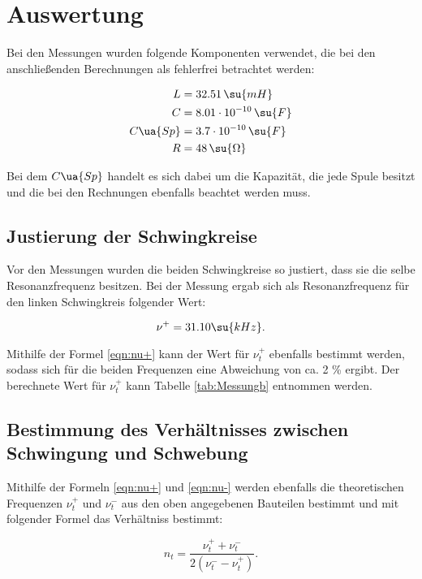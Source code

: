 \section{Auswertung}

Bei den Messungen wurden folgende Komponenten verwendet, die bei den anschließenden
Berechnungen als fehlerfrei betrachtet werden:

\begin{align}
  L        &= 32.51              \, \su{mH}       \\
  C        &= 8.01 \cdot 10^{-10}  \, \su{F}       \\
  C\ua{Sp} &= 3.7 \cdot 10^{-10}    \, \su{F}       \\
  R        &= 48                   \, \su{\Omega}
\end{align}

Bei dem $C\ua{Sp}$ handelt es sich dabei um die Kapazität, die jede Spule besitzt
und die bei den Rechnungen ebenfalls beachtet werden muss.

\subsection{Justierung der Schwingkreise}

Vor den Messungen wurden die beiden Schwingkreise so justiert, dass sie die
selbe Resonanzfrequenz besitzen. Bei der Messung ergab sich als Resonanzfrequenz
für den linken Schwingkreis folgender Wert:

\begin{equation}
  \nu^+ = 31.10 \su{kHz}.
\end{equation}

Mithilfe der Formel \eqref{eqn:nu+} kann der Wert für $\nu_t^{+}$ ebenfalls bestimmt werden,
sodass sich für die beiden Frequenzen eine Abweichung von ca. 2 \% ergibt. Der
berechnete Wert für $\nu_t^{+}$ kann Tabelle \ref{tab:Messungb} entnommen werden.

\subsection{Bestimmung des Verhältnisses zwischen Schwingung und Schwebung}


Mithilfe der Formeln \eqref{eqn:nu+} und \eqref{eqn:nu-} werden ebenfalls die theoretischen Frequenzen
$\nu_t^{+}$ und $\nu_t^{-}$ aus den oben angegebenen Bauteilen bestimmt und mit
folgender Formel das Verhältniss bestimmt:

\begin{equation}
  n_t = \frac{\nu_t^{+} + \nu_t^{-}}{2(\nu_t^{-} - \nu_t^{+})}.
\end{equation}

